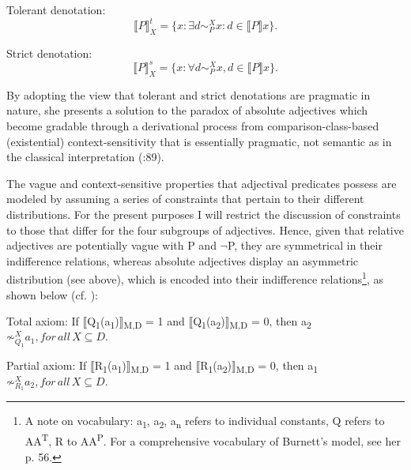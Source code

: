 \documentclass[output=paper
,modfonts
,nonflat]{langsci/langscibook}
\begin{document}
\begin{examples}
	\item Tolerant denotation: \[ \llbracket P \rrbracket_X^t	= \{x : \exists d \sim_P^X  x : d \in \llbracket P\rrbracket x\}\text{.}\]
	\item Strict denotation: \[\llbracket P\rrbracket_X^s  = \{ { x :  \forall d \sim _P^X  x, d  \in   \llbracket P \rrbracket x } \}\text{.}\]
\end{examples}

By adopting the view that tolerant and strict denotations are pragmatic in nature, she presents a solution to the paradox of absolute adjectives which become gradable through a derivational process from comparison-class-based (existential) context-sensitivity that is essentially pragmatic, not semantic as in the classical interpretation (\citeyear{Burnett2017}:89).

The vague and context-sensitive properties that adjectival predicates possess are modeled by assuming a series of constraints that pertain to their different distributions. For the present purposes I will restrict the discussion of constraints to those that differ for the four subgroups of adjectives. Hence, given that relative adjectives are potentially vague with P and $\neg$P, they are symmetrical in their indifference relations, whereas absolute adjectives display an asymmetric distribution (see above), which is encoded into their indifference relations\footnote{A note on vocabulary: a\textsubscript{1}, a\textsubscript{2}, a\textsubscript{n} refers to individual constants, Q refers to AA\textsuperscript{T}, R to AA\textsuperscript{P}. For a comprehensive vocabulary of Burnett's model, see her p. 56.}, as shown below (cf. \textcite[77]{Burnett2017}):

\begin{examples}
	\item Total axiom: If $\llbracket$Q\textsubscript{1}(a\textsubscript{1})$\rrbracket$\textsubscript{M,D} = 1 and $\llbracket$Q\textsubscript{1}(a\textsubscript{2})$\rrbracket$\textsubscript{M,D} = 0, then a\textsubscript{2} $ \not\sim_{Q_{1}}^X  a_{1}, for \, all \, X \subseteq D.$
	\item Partial axiom: If $\llbracket$R\textsubscript{1}(a\textsubscript{1})$\rrbracket$\textsubscript{M,D} = 1 and $\llbracket$R\textsubscript{1}(a\textsubscript{2})$\rrbracket$\textsubscript{M,D} = 0, then a\textsubscript{1} $ \not\sim_{R_{1}}^X  a_{2}, for \, all \, X \subseteq D.$
\end{examples}
\end{document}
